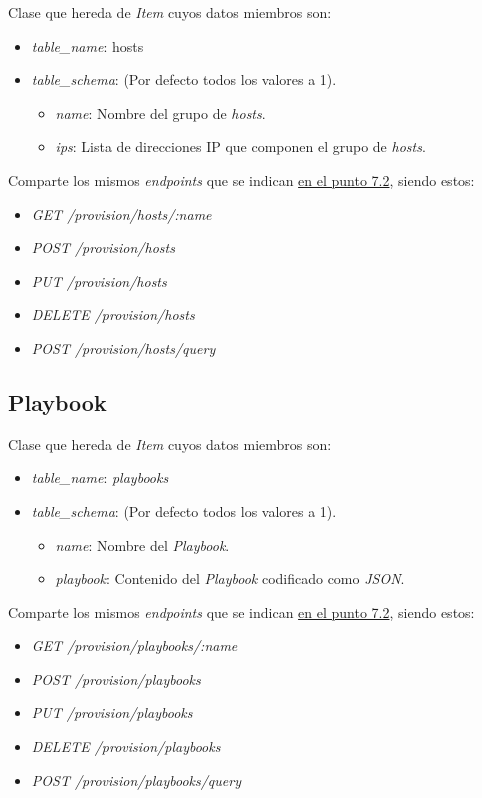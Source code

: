 Clase que hereda de \textit{Item} cuyos datos miembros son:
\begin{itemize}
	\item \textit{table\_name}: hosts
	\item \textit{table\_schema}: (Por defecto todos los valores a 1).
	\begin{itemize}
		\item \textit{name}: Nombre del grupo de \textit{hosts}.
		\item \textit{ips}: Lista de direcciones IP que componen el grupo de \textit{hosts}.
	\end{itemize}
\end{itemize}
	
\bigskip
Comparte los mismos \textit{endpoints} que se indican \hyperref[sec:servicios]{en el punto 7.2}, siendo estos:
\begin{itemize}
	\item \textit{GET /provision/hosts/:name}
	\item \textit{POST /provision/hosts}
	\item \textit{PUT /provision/hosts}
	\item \textit{DELETE /provision/hosts}
	\item \textit{POST /provision/hosts/query}
\end{itemize}


\subsection{Playbook}

Clase que hereda de \textit{Item} cuyos datos miembros son:
\begin{itemize}
	\item \textit{table\_name}: \textit{playbooks}
	\item \textit{table\_schema}: (Por defecto todos los valores a 1).
	\begin{itemize}
		\item \textit{name}: Nombre del \textit{Playbook}.
		\item \textit{playbook}: Contenido del \textit{Playbook} codificado como \textit{JSON}.
	\end{itemize}
\end{itemize}
	
\bigskip
Comparte los mismos \textit{endpoints} que se indican \hyperref[sec:servicios]{en el punto 7.2}, siendo estos:
\begin{itemize}
	\item \textit{GET /provision/playbooks/:name}
	\item \textit{POST /provision/playbooks}
	\item \textit{PUT /provision/playbooks}
	\item \textit{DELETE /provision/playbooks}
	\item \textit{POST /provision/playbooks/query}
\end{itemize}

